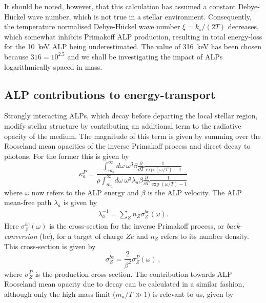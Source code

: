 It should be noted, however, that this calculation has assumed a constant Debye-H\"uckel wave number, which is not true in a stellar environment. Consequently, the temperature normalised Debye-H\"uckel wave number $\xi=k_s/(2T)$ decreases, which somewhat inhibits Primakoff ALP production, resulting in total energy-loss for the 10~keV ALP being underestimated. The value of 316~keV has been chosen because $316=10^{2.5}$ and we shall be investigating the impact of ALPs logarithmically spaced in mass. 


\subsection{ALP contributions to energy-transport}
Strongly interacting ALPs, which decay before departing the local stellar region, modify stellar structure by contributing an additional term to the radiative opacity of the medium. The magnitude of this term is given by summing over the Rooseland mean opacities of the inverse Primakoff process and direct decay to photons. For the former this is given by \cite{Cadamuro:2011fd}
\begin{equation}
    \kappa_a^{P}=\frac{\int_{m_a}^{\infty}d\omega\ \omega^3\beta\frac{\partial}{\partial T} \frac{1}{\exp(\omega/T)-1}}{\rho \int_{m_a}^{\infty}d\omega\ \omega^3\lambda_a\beta\frac{\partial}{\partial T} \frac{1}{\exp(\omega/T)-1}}
\end{equation}
where \(\omega\) now refers to the ALP energy and \(\beta\) is the ALP velocity. The ALP mean-free path \(\lambda_a\) is given by \cite{Cadamuro:2011fd}
\begin{align}
    \lambda_{a}^{-1}=\sum_{Z}n_Z\sigma_{Z}^{bc}(\omega).
\end{align}
Here \(\sigma_{Z}^{bc}(\omega)\) is the cross-section for the inverse Primakoff process, or \textit{back-conversion} (bc), for a target of charge \(Ze\) and \(n_Z\) refers to its number density. This cross-section is given by \cite{Dolan:2017osp}
\begin{equation}
    \sigma_{Z}^{bc}=\frac{2}{\beta^2}\sigma_{Z}^P(\omega) \, ,
\end{equation}
where $\sigma_{Z}^P$ is the production cross-section.
The contribution towards ALP Rooseland mean opacity due to decay can be calculated in a similar fashion, although only the high-mass limit ($m_a/T\gg1)$ is relevant to us, given by \cite{Raffelt_Energy_Transfer}
